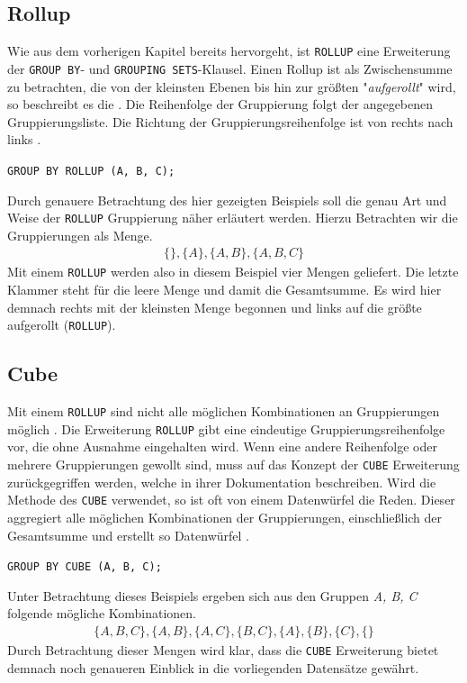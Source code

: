 \subsection{Rollup}
\label{subsec:rollup} Wie aus dem vorherigen Kapitel bereits hervorgeht, ist
\texttt{ROLLUP} eine Erweiterung der \texttt{GROUP BY}- und \texttt{GROUPING
SETS}-Klausel. Einen Rollup ist als Zwischensumme zu betrachten, die von der
kleinsten Ebenen bis hin zur größten "\textit{aufgerollt}" wird, so beschreibt
es die \citet{oracle99}. Die Reihenfolge der Gruppierung folgt der angegebenen
Gruppierungsliste. Die Richtung der Gruppierungsreihenfolge ist von rechts nach links
\citep[vgl.][]{oracle16}.
\begin{center}
	\texttt{GROUP BY ROLLUP (A, B, C);}
\end{center}
Durch genauere Betrachtung des hier gezeigten Beispiels soll die genau Art und Weise
der \texttt{ROLLUP} Gruppierung näher erläutert werden. Hierzu Betrachten wir die
Gruppierungen als Menge.
\begin{align*}
	\{ \}, \{A\}, \{A, B\}, \{A, B, C\}
\end{align*}
Mit einem \texttt{ROLLUP} werden also in diesem Beispiel vier Mengen geliefert.
Die letzte Klammer steht für die leere Menge und damit die Gesamtsumme. Es wird hier
demnach rechts mit der kleinsten Menge begonnen und links auf die größte aufgerollt
(\texttt{ROLLUP}).

\subsection{Cube}
\label{subsec:cube} Mit einem \texttt{ROLLUP} sind nicht alle möglichen Kombinationen
an Gruppierungen möglich \citep[vgl.][]{oracle99}. Die Erweiterung \texttt{ROLLUP}
gibt eine eindeutige Gruppierungsreihenfolge vor, die ohne Ausnahme eingehalten wird.
Wenn eine andere Reihenfolge oder mehrere Gruppierungen gewollt sind, muss auf das
Konzept der \texttt{CUBE} Erweiterung zurückgegriffen werden, welche \citet{oracle99}
in ihrer Dokumentation beschreiben. Wird die Methode des \texttt{CUBE} verwendet,
so ist oft von einem Datenwürfel die Reden. Dieser aggregiert
alle möglichen Kombinationen der Gruppierungen, einschließlich der Gesamtsumme
und erstellt so Datenwürfel \citep[vgl.][]{oracle99}.
\begin{center}
	\texttt{GROUP BY CUBE (A, B, C);}
\end{center}
Unter Betrachtung dieses Beispiels ergeben sich aus den Gruppen \textit{A, B, C}
folgende mögliche Kombinationen.
\begin{align*}
	\{ A, B, C\}, \{A, B\}, \{A, C\}, \{B, C\}, \{A\}, \{B\}, \{C\}, \{ \}
\end{align*}
Durch Betrachtung dieser Mengen wird klar, dass die \texttt{CUBE} Erweiterung bietet
demnach noch genaueren Einblick in die vorliegenden Datensätze gewährt.
